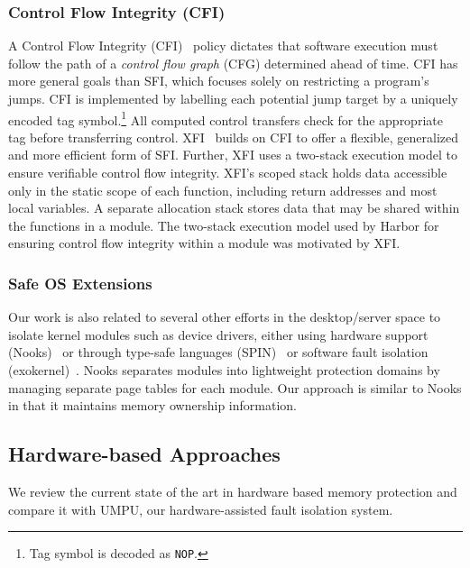 \subsubsection{Control Flow Integrity (CFI)}
%
A Control Flow Integrity (CFI)~\cite{cfi05msr} policy dictates that
software execution must follow the path of a \emph{control flow graph}
(CFG) determined ahead of time.
%
CFI has more general goals than SFI, which focuses solely on restricting a
program's jumps.
%
CFI is implemented by labelling each potential jump target by a
uniquely encoded tag symbol.\footnote{Tag symbol is decoded as
  \texttt{NOP}.}
%
All computed control transfers check for the appropriate tag before
transferring control.
%
XFI~\cite{xfi06osdi} builds on CFI to offer a
flexible, generalized and more efficient form of SFI.
%
Further, XFI uses a two-stack execution model to ensure verifiable
control flow integrity.
%
XFI's scoped stack holds data accessible only in the static scope of
each function, including return addresses and most local variables.
%
A separate allocation stack stores data that may be shared within the
functions in a module.
%
The two-stack execution model used by Harbor for ensuring control flow
integrity within a module was motivated by XFI.
%
\subsubsection{Safe OS Extensions}
%
Our work is also related to several other efforts in the
desktop/server space to isolate kernel modules such as device drivers,
either using hardware support (Nooks)~\cite{swift05nooks} or through type-safe
languages (SPIN)~\cite{spin95sosp} or software fault isolation
(exokernel)~\cite{exo97sosp}.
%
Nooks separates modules into lightweight protection domains by
managing separate page tables for each module.
%
Our approach is similar to Nooks in that it maintains memory ownership
information.
%
\subsection{Hardware-based Approaches}
%
We review the current state of the art in hardware based memory protection
and compare it with UMPU, our hardware-assisted fault isolation system.
%
